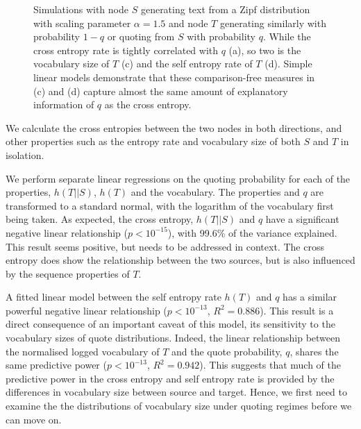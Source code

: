 \begin{figure}[!htbp]
\centering

\caption{Simulations with node $S$ generating text from a Zipf distribution with scaling parameter $\alpha=1.5$ and node $T$ generating similarly with probability $1-q$ or quoting from $S$ with probability $q$. While the cross entropy rate is tightly correlated with $q$ (a), so two is the vocabulary size of $T$ (c) and the self entropy rate of $T$ (d). Simple linear models demonstrate that these comparison-free measures in (c) and (d) capture almost the same amount of explanatory information of $q$ as the cross entropy.}\label{fig:fixedalphasingleflow}
\end{figure}

We calculate the cross entropies between the two nodes in both directions, and other properties such as the entropy rate and vocabulary size of both $S$ and $T$ in isolation.

We perform separate linear regressions on the quoting probability for each of the properties, $h(T||S)$, $h(T)$ and the vocabulary. The properties and $q$ are transformed to a standard normal, with the logarithm of the vocabulary first being taken.
As expected, the cross entropy, $h(T||S)$ and $q$ have a significant negative linear relationship ($p<10^{-15}$), with 99.6\% of the variance explained. This result seems positive, but needs to be addressed in context. The cross entropy does show the relationship between the two sources, but is also influenced by the sequence properties of $T$.

A fitted linear model between the self entropy rate $h(T)$ and $q$ has a similar powerful negative linear relationship ($p<10^{-13}$, $R^2 = 0.886$). This result is a direct consequence of an important caveat of this model, its sensitivity to the vocabulary sizes of quote distributions. Indeed, the linear relationship between the normalised logged vocabulary of $T$ and the quote probability, $q$, shares the same predictive power ($p<10^{-13}$, $R^2 = 0.942$). This suggests that much of the predictive power in the cross entropy and self entropy rate is provided by the differences in vocabulary size between source and target. Hence, we first need to examine the the distributions of vocabulary size under quoting regimes before we can move on.


